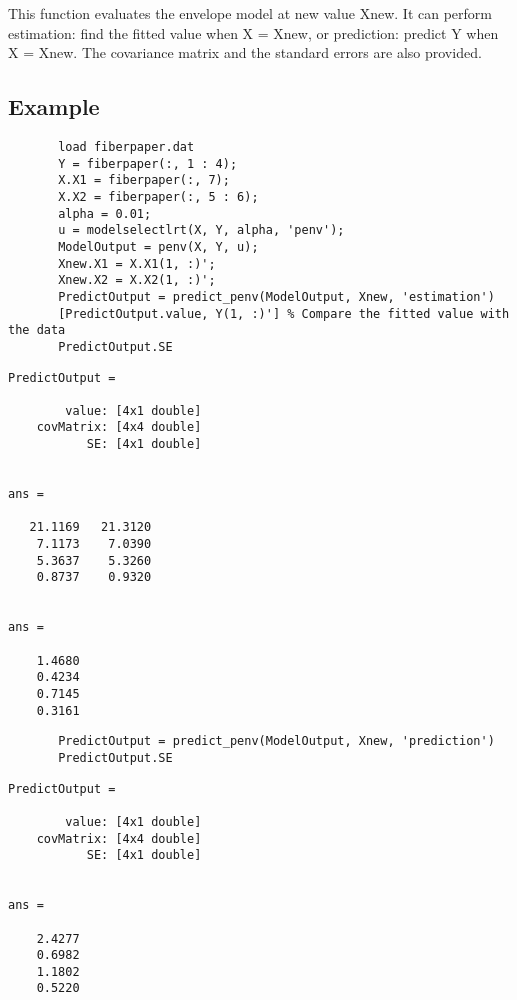 \documentclass[a4paper,11pt,openany]{memoir}
\begin{document}
\begin{par}
This function evaluates the envelope model at new value Xnew.  It can perform estimation: find the fitted value when X = Xnew, or prediction: predict Y when X = Xnew.  The covariance matrix and the standard errors are also provided.
\end{par} \vspace{1em}


\subsection*{Example}


\begin{verbatim}       load fiberpaper.dat
       Y = fiberpaper(:, 1 : 4);
       X.X1 = fiberpaper(:, 7);
       X.X2 = fiberpaper(:, 5 : 6);
       alpha = 0.01;
       u = modelselectlrt(X, Y, alpha, 'penv');
       ModelOutput = penv(X, Y, u);
       Xnew.X1 = X.X1(1, :)';
       Xnew.X2 = X.X2(1, :)';
       PredictOutput = predict_penv(ModelOutput, Xnew, 'estimation')
       [PredictOutput.value, Y(1, :)'] % Compare the fitted value with the data
       PredictOutput.SE\end{verbatim}
    
        \color{lightgray}\ttfamily \begin{verbatim}
PredictOutput = 

        value: [4x1 double]
    covMatrix: [4x4 double]
           SE: [4x1 double]


ans =

   21.1169   21.3120
    7.1173    7.0390
    5.3637    5.3260
    0.8737    0.9320


ans =

    1.4680
    0.4234
    0.7145
    0.3161
\end{verbatim} \rmfamily
\color{black}

       \begin{verbatim}
       PredictOutput = predict_penv(ModelOutput, Xnew, 'prediction')
       PredictOutput.SE\end{verbatim}
        \color{lightgray}\ttfamily \begin{verbatim}
PredictOutput = 

        value: [4x1 double]
    covMatrix: [4x4 double]
           SE: [4x1 double]


ans =

    2.4277
    0.6982
    1.1802
    0.5220

\end{verbatim} \rmfamily
\color{black}
\end{document}
